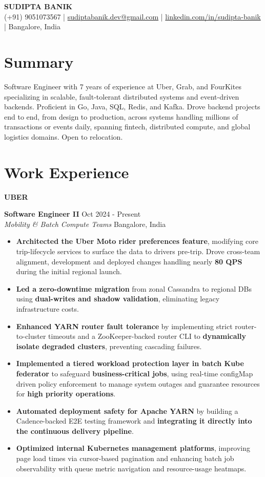 \documentclass[11pt,a4paper]{article}
\newcommand{\companyheader}[1]{%
    \vspace{3pt}%
    {\Large\bfseries #1}%
    \vspace{3pt}%
}
\newcommand{\roleblock}[5]{%
    \vspace{2pt}%
    \noindent%
    \textbf{#1} \hfill #2 \\%
    \textit{#3} \hfill #4 \vspace{3pt}%
    \begin{itemize}[%
        leftmargin=*,%
        noitemsep,%
        topsep=1pt,%
        label={\small\textbullet},%
        itemsep=0pt%
    ]%
    \RaggedRight%
    \def\baselinestretch{1.0}%
        #5%
    \end{itemize}%
    \vspace{1pt}%
}
\begin{document}
\begin{center}
    {\fontsize{22pt}{24pt}\selectfont\bfseries SUDIPTA BANIK}\\[7pt]
    \small
    (+91) 9051073567 \quad|\quad
    \href{mailto:sudiptabanik.dev@gmail.com}{sudiptabanik.dev@gmail.com} \quad|\quad
    \href{https://www.linkedin.com/in/sudipta-banik}{linkedin.com/in/sudipta-banik} \quad|\quad
    Bangalore, India
\end{center}
\vspace{1pt}

\section{Summary}
\noindent Software Engineer with 7 years of experience at Uber, Grab, and FourKites specializing in scalable, fault-tolerant distributed systems and event-driven backends. Proficient in Go, Java, SQL, Redis, and Kafka. Drove backend projects end to end, from design to production, across systems handling millions of transactions or events daily, spanning fintech, distributed compute, and global logistics domains. Open to relocation.

\section{Work Experience}

\companyheader{UBER}

\roleblock
{Software Engineer II}
{Oct 2024 - Present}
{Mobility \& Batch Compute Teams}
{Bangalore, India}
{
    \item \textbf{Architected the Uber Moto rider preferences feature}, modifying core trip-lifecycle services to surface the data to drivers pre-trip. Drove cross-team alignment, development and deployed changes handling nearly \textbf{80 QPS} during the initial regional launch.
    \item \textbf{Led a zero-downtime migration} from zonal Cassandra to regional DBs using \textbf{dual-writes and shadow validation}, eliminating legacy infrastructure costs.
    \item \textbf{Enhanced YARN router fault tolerance} by implementing strict router-to-cluster timeouts and a ZooKeeper-backed router CLI to \textbf{dynamically isolate degraded clusters}, preventing cascading failures.
    \item \textbf{Implemented a tiered workload protection layer in batch Kube federator} to safeguard \textbf{business-critical jobs}, using real-time configMap driven policy enforcement to manage system outages and guarantee resources for \textbf{high priority operations}.
    \item \textbf{Automated deployment safety for Apache YARN} by building a Cadence-backed E2E testing framework and \textbf{integrating it directly into the continuous delivery pipeline}.
    \item \textbf{Optimized internal Kubernetes management platforms}, improving page load times via cursor-based pagination and enhancing batch job observability with queue metric navigation and resource-usage heatmaps.
}
\end{document}
